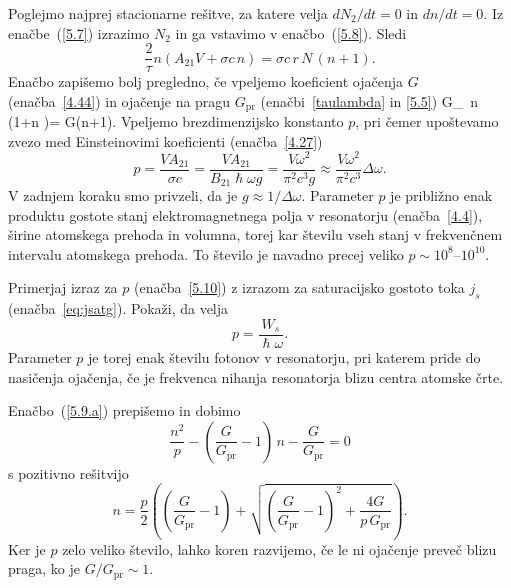 Poglejmo najprej stacionarne rešitve, za katere velja $dN_2/dt=0$ in 
$dn/dt=0$. Iz enačbe~(\ref{5.7}) izrazimo $N_{2}$ in ga vstavimo v enačbo~(\ref{5.8}).
Sledi 
\begin{equation}
\frac{2}{\tau }n\left(A_{21}V+\sigma c\,n\right)=
\sigma c\, r\,N\,(n+1).
\label{5.9}
\end{equation}
Enačbo zapišemo bolj pregledno, če vpeljemo koeficient ojačenja $G$ (enačba~\ref{4.44})
in ojačenje na pragu $G_\mathrm{pr}$ (enačbi~\ref{taulambda} in \ref{5.5})
\beq
G_\, n\, \left(1+n \right)= G(n+1).
\label{5.9.a}
\eeq
Vpeljemo brezdimenzijsko konstanto $p$, pri čemer upoštevamo zvezo
med Einsteinovimi koeficienti (enačba~\ref{4.27})
\begin{equation}
p=\frac{VA_{21}}{\sigma c} = 
\frac{VA_{21}}{B_{21}\hslash \omega g}=\frac{V\omega ^{2}}{\pi
^{2}c^{3}g}\approx
\frac{V\omega ^{2}}{\pi ^{2}c^{3}}\Delta \omega.  
\label{5.10}
\end{equation}
V zadnjem koraku smo privzeli, da je $g\approx 1/\Delta \omega $. 
Parameter $p$ je približno enak produktu 
gostote stanj elektromagnetnega polja v resonatorju (enačba~\ref{4.4}),
širine atomskega prehoda in volumna, torej kar številu vseh stanj 
v frekvenčnem intervalu atomskega prehoda. To število je navadno precej 
veliko $p \sim 10^{8}$--$10^{10}$. 

\begin{naloga}
Primerjaj izraz za $p$ (enačba~\ref{5.10}) z izrazom za saturacijsko 
gostoto toka $j_s$ (enačba~\ref{eq:jsatg}). Pokaži, da velja
\begin{equation}
p = \frac{W_s}{\hslash \omega}.
\end{equation}
Parameter $p$ je torej enak številu fotonov v resonatorju, pri katerem pride 
do nasičenja ojačenja, če je frekvenca nihanja resonatorja blizu 
centra atomske črte. 
\end{naloga}

Enačbo~(\ref{5.9.a}) prepišemo in dobimo
\begin{equation}
\frac{n^2}{p}-\left(\frac{G}{G_\mathrm{pr}}-1\right)\,n-\frac{G}{G_\mathrm{pr}}=0
\label{5.11}
\end{equation}
s pozitivno rešitvijo 
\begin{equation}
n=\frac{p}{2}\left( \left(\frac{G}{G_\mathrm{pr}}-1\right)+\sqrt{\left(\frac{G}{G_\mathrm{pr}}
-1\right)^{2}+ \frac{4G}{p\,G_\mathrm{pr}}}\right).
\label{5.12}
\end{equation}
Ker je $p$ zelo veliko število, lahko koren razvijemo, če le ni ojačenje
preveč blizu praga, ko je $G/G_\mathrm{pr}\sim 1$. 

